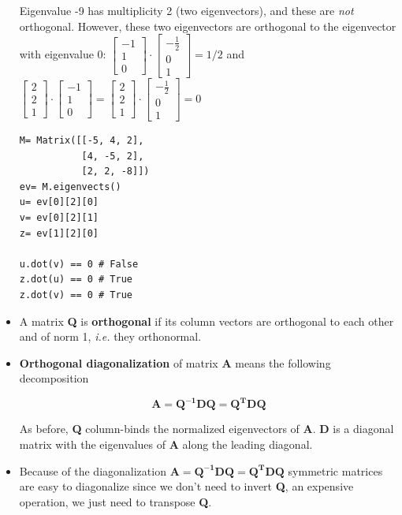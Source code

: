 \begin{itemize}
Eigenvalue -9 has multiplicity 2 (two eigenvectors), and these are \emph{not} orthogonal.
However, these two eigenvectors are orthogonal to the eigenvector with eigenvalue
0: $\left[\begin{matrix}-1\\1\\0\end{matrix}\right] \cdot \left[\begin{matrix}- \frac{1}{2}\\0\\1\end{matrix}\right]  = 1/2$ and
$\left[\begin{matrix}2\\2\\1\end{matrix}\right] \cdot \left[\begin{matrix}-1\\1\\0\end{matrix}\right] =
\left[\begin{matrix}2\\2\\1\end{matrix}\right] \cdot \left[\begin{matrix}- \frac{1}{2}\\0\\1\end{matrix}\right] = 0$

\begin{verbatim}
M= Matrix([[-5, 4, 2],
           [4, -5, 2],
           [2, 2, -8]])
ev= M.eigenvects()
u= ev[0][2][0]
v= ev[0][2][1]
z= ev[1][2][0]

u.dot(v) == 0 # False
z.dot(u) == 0 # True
z.dot(v) == 0 # True
\end{verbatim}

\item A matrix \textbf{Q} is \textbf{orthogonal} if its column vectors are orthogonal to each other and
of norm 1, \emph{i.e.} they orthonormal.

\item \textbf{Orthogonal diagonalization} of matrix \textbf{A} means the following decomposition

$$
\mathbf{A = Q^{-1}DQ = Q^TDQ}
$$

As before, \textbf{Q} column-binds the normalized eigenvectors of \textbf{A}. \textbf{D}
is a diagonal matrix with the eigenvalues of \textbf{A} along the leading diagonal.

\item Because of the diagonalization $\mathbf{A = Q^{-1}DQ = Q^TDQ}$ symmetric
matrices are easy to diagonalize since we don't need to invert \textbf{Q}, an
expensive operation, we just need to transpose \textbf{Q}.
\end{itemize}

